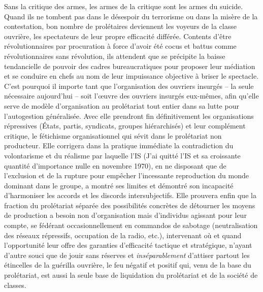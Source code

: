 \documentclass[french,twoside]{book} %
\begin{document}
Sans la critique des armes, les armes de la critique sont les armes du suicide. Quand ils ne tombent pas dans le désespoir du terrorisme ou dans la misère de la contestation, bon nombre de prolétaires deviennent les voyeurs de la classe ouvrière, les spectateurs de leur propre efficacité différée. Contents d’être révolutionnaires par procuration à force d’avoir été cocus et battus comme révolutionnaires sans révolution, ils attendent que se précipite la baisse tendancielle de pouvoir des cadres bureaucratiques pour proposer leur médiation et se conduire en chefs au nom de leur impuissance objective à briser le spectacle. C’est pourquoi il importe tant que l’organisation des ouvriers insurgés – la seule nécessaire aujourd’hui – soit l’œuvre des ouvriers insurgés eux-mêmes, afin qu’elle serve de modèle d’organisation au prolétariat tout entier dans sa lutte pour l’autogestion généralisée. Avec elle prendront fin définitivement les organisations répressives (États, partis, syndicats, groupes hiérarchisés) et leur complément critique, le fétichisme organisationnel qui sévit dans le prolétariat non producteur. Elle corrigera dans la pratique immédiate la contradiction du volontarisme et du réalisme par laquelle l’IS (J’ai quitté l’IS et sa croissante quantité d’importance nulle en novembre 1970), en ne disposant que de l’exclusion et de la rupture pour empêcher l’incessante reproduction du monde dominant dans le groupe, a montré ses limites et démontré son incapacité d’harmoniser les accords et les discords intersubjectifs. Elle prouvera enfin que la fraction du prolétariat séparée des possibilités concrètes de détourner les moyens de production a besoin non d’organisation mais d’individus agissant pour leur compte, se fédérant occasionnellement en commandos de sabotage (neutralisation des réseaux répressifs, occupation de la radio, etc.), intervenant où et quand l’opportunité leur offre des garanties d’efficacité tactique et stratégique, n’ayant d’autre souci que de jouir sans réserves et \emph{inséparablement} d’attiser partout les étincelles de la guérilla ouvrière, le feu négatif et positif qui, venu de la base du prolétariat, est aussi la seule base de liquidation du prolétariat et de la société de classes.\par
\end{document}
